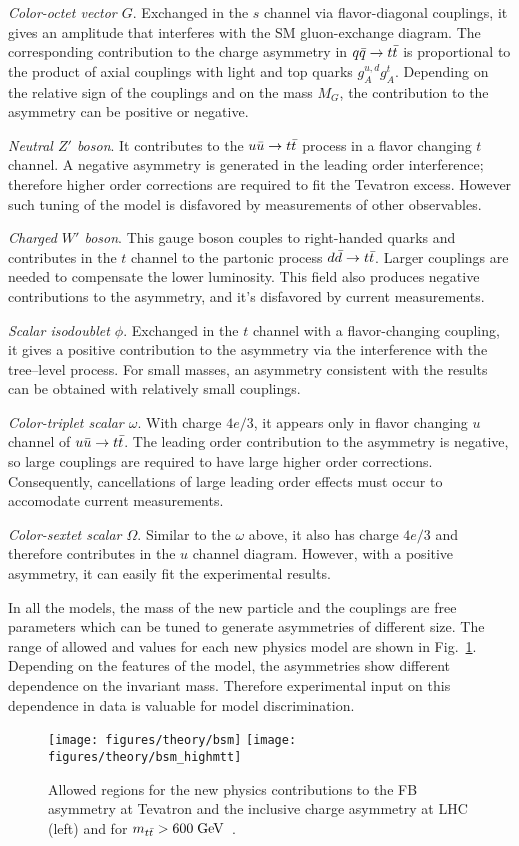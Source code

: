 {\em Color-octet vector $G$}. Exchanged in the $s$ channel via
flavor-diagonal couplings, it gives 
an amplitude that interferes with the SM gluon-exchange diagram. The
corresponding contribution to the charge asymmetry in
\mbox{$q\bar{q}{}\to t\bar{t}{}$} is proportional to the product of axial
couplings with light and top quarks $g_A^{u,d}g_A^t$. Depending on the
relative sign of the couplings and on the mass $M_G$, the contribution
to the asymmetry can be positive or negative. 

{\em Neutral $Z'$ boson}. It contributes to the $u\bar{u}{}\to t\bar{t}{}$
process in a flavor changing $t$ channel. A negative asymmetry
is generated in the leading order interference; therefore higher order
corrections are required to fit the Tevatron excess. However such
tuning of the model is disfavored by measurements of other observables.

{\em Charged $W'$ boson}. This gauge boson couples to right-handed
quarks and contributes in the $t$ channel to the partonic process
$d\bar{d}{}\to t\bar{t}{}$. Larger couplings are needed to compensate the
lower \ddbar{} luminosity. This field also produces negative
contributions to the asymmetry, and it's disfavored by current measurements.

{\em Scalar isodoublet $\phi$}.
Exchanged in the $t$ channel with a flavor-changing coupling, it gives
a positive contribution to the asymmetry via the interference with the
tree--level process. For small masses, an asymmetry consistent with the
\afb{} results can be obtained with relatively small couplings.

{\em Color-triplet scalar $\omega$}.
With charge $4e/3$, it appears only in flavor changing $u$ channel of
$u\bar{u}{}\to t\bar{t}{}$. The leading order contribution to the asymmetry
is negative, so large couplings are required to have large higher
order corrections. Consequently, cancellations of large leading order
effects must occur to accomodate current measurements.

{\em Color-sextet scalar $\Omega$}.
Similar to the $\omega$ above, it also has charge $4e/3$ and therefore
contributes in the $u$ channel diagram. However, with a positive
asymmetry, it can easily fit the experimental results.

In all the models, the mass of the new particle and the couplings are
free parameters which can be tuned to generate asymmetries of
different size. The range of allowed \ac{} and \afb{} values for each
new physics model are shown in Fig.~\ref{fig:bsmmodels}. Depending on
the features of the model, the asymmetries show different dependence
on the \ttbar{} invariant mass. Therefore experimental input on this
dependence in data is valuable for model discrimination. 

\begin{figure}[!htb]
  \centering
  \texttt{[image: figures/theory/bsm]} 
  \texttt{[image: figures/theory/bsm\_highmtt]} 
  \caption{Allowed regions for the new physics contributions to the FB
    asymmetry at Tevatron and the inclusive charge asymmetry at LHC
    (left) and for $m_{t\bar{t}}{}>600 \; \mathrm{GeV}$~\cite{AguilarSaavedra:2011hz}.}
  \label{fig:bsmmodels}
\end{figure}


